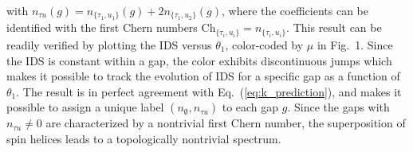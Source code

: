 \documentclass[
    10pt,
    aps,
    prl,
    twocolumn,
    floatfix,
    superscriptaddress
]{revtex4-2}
\begin{document}
with $n_{\tau u}(g) =  n_{ \lbrace \tau_1, u_1 \rbrace}(g) + 2 n_{ \lbrace \tau_1, u_2 \rbrace}(g) $, where the coefficients can be identified with the first Chern numbers 
$ \mathrm{Ch}_{ \lbrace \tau_i, u_i \rbrace} = n_{ \lbrace \tau_i, u_i \rbrace}$. 
This result can be readily verified by plotting the IDS versus $\theta_1$, color-coded by $\mu$ in Fig.~1.
Since the IDS is constant within a gap, the color exhibits discontinuous jumps which makes it possible to track the evolution of IDS for a specific gap as a function of $\theta_1$.
The result is in perfect agreement with Eq.~(\ref{eq:k_prediction}), and makes it possible to assign a unique label $(n_\emptyset, n_{\tau u})$ to each gap $g$.
Since the gaps with $n_{\tau u} \neq 0$ are characterized by a nontrivial first Chern number, the superposition of spin helices leads to a topologically nontrivial spectrum.


\end{document}
